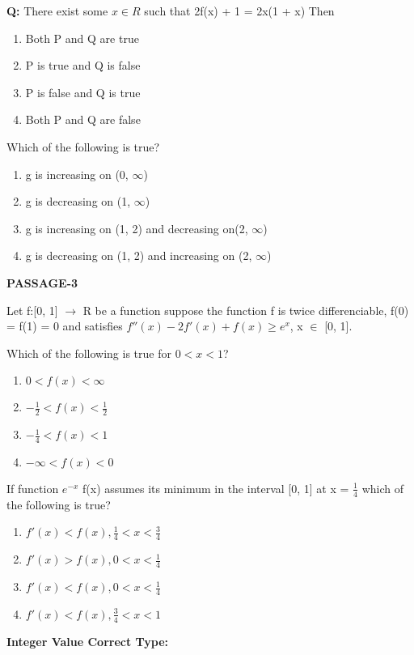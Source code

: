 \textbf{Q:} There exist some $x \in R$ such that 2f(x) + 1 = 2x(1 + x)
Then 
\begin{enumerate}
\item Both P and Q are true
\item P is true and Q is false
\item P is false and Q is true
\item Both P and Q are false
\end{enumerate}

\item Which of the following is true?
\begin{enumerate}
\item g is increasing on (0, $\infty$)
\item g is decreasing on (1, $\infty$)
\item g is increasing on (1, 2) and decreasing on(2, $\infty$)
\item g is decreasing on (1, 2) and increasing on (2, $\infty$)
\end{enumerate}

\textbf{PASSAGE-3}

Let f:[0, 1] $\to$ R be a function suppose the function f is twice differenciable, f(0) = f(1) = 0 and satisfies $f''(x) - 2f'(x) + f(x) \geq e^x$, x $\in$ [0, 1].

\item Which of the following is true for $0 < x < 1$?
\begin{enumerate}
\item $0 < f(x) < \infty$
\item $-\frac{1}{2} < f(x) < \frac{1}{2}$
\item $-\frac{1}{4} < f(x) < 1$
\item $-\infty < f(x) < 0$
\end{enumerate}

\item If function $e^{-x}$ f(x) assumes its minimum in the interval [0, 1] at x = $\frac{1}{4}$ which of the following is true?
\begin{enumerate}
\item $f'(x) < f(x), \frac{1}{4} < x < \frac{3}{4}$
\item $f'(x) > f(x),  0 < x < \frac{1}{4}$
\item $f'(x) < f(x),  0 < x < \frac{1}{4}$
\item $f'(x) < f(x),  \frac{3}{4} < x < 1$
\end{enumerate}

\textbf{Integer Value Correct Type:}

